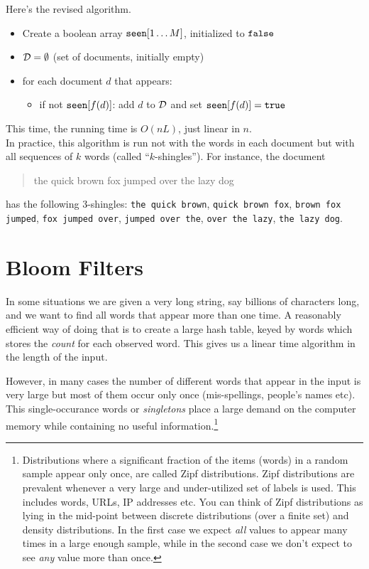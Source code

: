 Here's the revised algorithm.
\begin{itemize}
\item Create a boolean array ${\tt seen}[1\ldots M]$, initialized to ${\tt false}$
\item ${\cal D} = \emptyset$ (set of documents, initially empty)
\item for each document $d$ that appears:
\begin{itemize}
\item if not ${\tt seen}[f(d)]$: add $d$ to ${\cal D}$ and set ${\tt seen}[f(d)] = {\tt true}$
\end{itemize}
\end{itemize}
This time, the running time is $O(nL)$, just linear in $n$.
\\

In practice, this algorithm is run not with the words in each document but with all 
sequences of $k$ words (called ``$k$-shingles''). For instance, the document
\begin{quote}
the quick brown fox jumped over the lazy dog
\end{quote}
has the following 3-shingles: {\tt the quick brown}, {\tt quick brown fox}, {\tt brown fox 
jumped}, {\tt fox jumped over}, {\tt jumped over the}, {\tt over the lazy}, {\tt the lazy dog}.

\section{Bloom Filters}

In some situations we are given a very long string, say billions of
characters long, and we want to find all words that appear more than
one time. A reasonably efficient way of doing that is to create a large hash
table, keyed by words which stores the {\em count} for each
observed word.  This gives us a linear time algorithm in the length of
the input. 

However, in many cases the number of different words that appear in
the input is very large but most of them occur only once
(mis-spellings, people's names etc). This single-occurance words or
{\em singletons} place a large demand on the computer memory while
containing no useful information.\footnote{ Distributions where a
  significant fraction of the items (words) in a random sample appear
  only once, are called Zipf distributions.  Zipf distributions are
  prevalent whenever a very large and under-utilized set of labels is
  used. This includes words, URLs, IP addresses etc.  You can think of
  Zipf distributions as lying in the mid-point between discrete
  distributions (over a finite set) and density distributions. In the
  first case we expect {\em all} values to appear many times in a
  large enough sample, while in the second case we don't expect to see
  {\em any} value more than once.}

